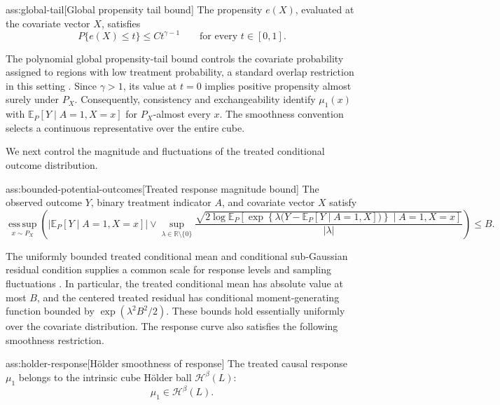 \documentclass[11pt]{article}
\begin{document}
\begin{assumptionv}{ass:global-tail}[Global propensity tail bound]
The propensity \(e(X)\), evaluated at the covariate vector \(X\), satisfies
\[
P\{e(X)\le t\}\le Ct^{\gamma-1}
\qquad\text{for every }t\in[0,1].
\]
\end{assumptionv}

The polynomial global propensity-tail bound controls the covariate probability assigned to regions with low treatment probability, a standard overlap restriction in this setting \citep{Dorn2026GlobalOverlap}. Since \(\gamma>1\), its value at \(t=0\) implies positive propensity almost surely under \(P_X\). Consequently, consistency and exchangeability identify \(\mu_1(x)\) with \(\mathbb E_P[Y\mid A=1,X=x]\) for \(P_X\)-almost every \(x\). The smoothness convention selects a continuous representative over the entire cube.

We next control the magnitude and fluctuations of the treated conditional outcome distribution.

\begin{assumptionv}{ass:bounded-potential-outcomes}[Treated response magnitude bound]
The observed outcome \(Y\), binary treatment indicator \(A\), and covariate vector \(X\) satisfy
\[
\operatorname*{ess\,sup}_{x\sim P_X}
\left(
 \left|\mathbb E_P[Y\mid A=1,X=x]\right|
 \vee
 \sup_{\lambda\in\mathbb R\setminus\{0\}}
 \frac{\sqrt{2\log \mathbb E_P\!\left[
   \exp\!\left\{\lambda\bigl(Y-\mathbb E_P[Y\mid A=1,X]\bigr)\right\}
   \mid A=1,X=x\right]}}{|\lambda|}
\right)
\le B.
\]
\end{assumptionv}

The uniformly bounded treated conditional mean and conditional sub-Gaussian residual condition supplies a common scale for response levels and sampling fluctuations \citep{Dorn2026GlobalOverlap}. In particular, the treated conditional mean has absolute value at most \(B\), and the centered treated residual has conditional moment-generating function bounded by \(\exp(\lambda^2B^2/2)\). These bounds hold essentially uniformly over the covariate distribution. The response curve also satisfies the following smoothness restriction.

\begin{assumptionv}{ass:holder-response}[Hölder smoothness of response]
The treated causal response \(\mu_1\) belongs to the intrinsic cube Hölder ball \(\mathcal H^\beta(L)\):
\[
\mu_1\in\mathcal H^\beta(L).
\]
\end{assumptionv}
\end{document}
